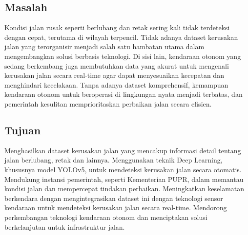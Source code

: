 \documentclass[12pt,a4paper]{article}
\begin{document}
\subsection{Masalah}
\begin{adjustwidth}{3em}{0pt} 
\hspace{0.5cm} Kondisi jalan rusak seperti berlubang dan retak sering kali tidak terdeteksi dengan cepat, terutama di wilayah terpencil. Tidak adanya dataset kerusakan jalan yang terorganisir menjadi salah satu hambatan utama dalam mengembangkan solusi berbasis teknologi. Di sisi lain, kendaraan otonom yang sedang berkembang juga membutuhkan data yang akurat untuk mengenali kerusakan jalan secara real-time agar dapat menyesuaikan kecepatan dan menghindari kecelakaan. Tanpa adanya dataset komprehensif, kemampuan kendaraan otonom untuk beroperasi di lingkungan nyata menjadi terbatas, dan pemerintah kesulitan memprioritaskan perbaikan jalan secara efisien. \end{adjustwidth}

\subsection{Tujuan}
\begin{adjustwidth}{3em}{0pt} 
\hspace{0.5cm} Menghasilkan dataset kerusakan jalan yang mencakup informasi detail tentang jalan berlubang, retak dan lainnya.
Menggunakan teknik Deep Learning, khususnya model YOLOv5, untuk mendeteksi kerusakan jalan secara otomatis.
Mendukung instansi pemerintah, seperti Kementerian PUPR, dalam memantau kondisi jalan dan mempercepat tindakan perbaikan.
Meningkatkan keselamatan berkendara dengan mengintegrasikan dataset ini dengan teknologi sensor kendaraan untuk mendeteksi kerusakan jalan secara real-time.
Mendorong perkembangan teknologi kendaraan otonom dan menciptakan solusi berkelanjutan untuk infrastruktur jalan.
\end{adjustwidth}


\end{document}
